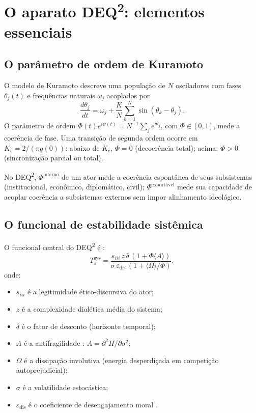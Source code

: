 \documentclass[12pt]{article}
\theoremstyle{definition}
\theoremstyle{remark}
\providecommand{\tightlist}{\setlength{\itemsep}{0pt}\setlength{\parskip}{0pt}}
\begin{document}
\section{O aparato DEQ\textsuperscript{2}: elementos essenciais}

\subsection{O parâmetro de ordem de Kuramoto}

O modelo de Kuramoto \citep{kuramoto1984} descreve uma popula\c{c}\~{a}o de \(N\) osciladores com fases \(\theta_j(t)\) e frequ\^{e}ncias naturais \(\omega_j\) acoplados por
\[
\frac{d\theta_j}{dt} = \omega_j + \frac{K}{N}\sum_{k=1}^{N}\sin(\theta_k - \theta_j).
\]
O par\^{a}metro de ordem \(\Phi(t) e^{i\psi(t)} = N^{-1}\sum_j e^{i\theta_j}\), com \(\Phi \in [0,1]\), mede a coer\^{e}ncia de fase. Uma transi\c{c}\~{a}o de segunda ordem ocorre em \(K_c = 2/(\pi g(0))\): abaixo de \(K_c\), \(\Phi = 0\) (decoer\^{e}ncia total); acima, \(\Phi > 0\) (sincroniza\c{c}\~{a}o parcial ou total).

No DEQ\textsuperscript{2}, \(\Phi^{\text{interno}}\) de um ator mede a coer\^{e}ncia espontânea de seus subsistemas (institucional, econômico, diplomático, civil); \(\Phi^{\text{exportável}}\) mede sua capacidade de acoplar coer\^{e}ncia a subsistemas externos sem impor alinhamento ideológico.

\subsection{O funcional de estabilidade sistêmica}

O funcional central do DEQ\textsuperscript{2} \'{e} \citep{marcelino2026c}:
\begin{equation}\label{eq:ts-sys}
T_s^{\text{sys}} = \frac{s_{iii} \, z \, \delta \, (1 + \Phi \langle A \rangle)}{\sigma \, \varepsilon_{\text{dis}} \, (1 + \langle\Omega\rangle / \Phi)},
\end{equation}
onde:
\begin{itemize}\tightlist
\item \(s_{iii}\) \'{e} a legitimidade \'{e}tico-discursiva do ator;
\item \(z\) \'{e} a complexidade dial\'{e}tica m\'{e}dia do sistema;
\item \(\delta\) \'{e} o fator de desconto (horizonte temporal);
\item \(A\) \'{e} a antifragilidade \citep{taleb2012}: \(A = \partial^2\Pi/\partial\sigma^2\);
\item \(\Omega\) \'{e} a dissipa\c{c}\~{a}o involutiva (energia desperdi\c{c}ada em competi\c{c}\~{a}o autoprejudicial);
\item \(\sigma\) \'{e} a volatilidade estoc\'{a}stica;
\item \(\varepsilon_{\text{dis}}\) \'{e} o coeficiente de desengajamento moral \citep{bandura1999}.
\end{itemize}
\end{document}
